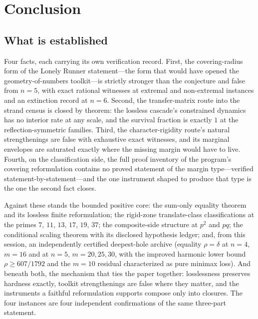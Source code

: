 
\section{Conclusion}\label{sec:concl}

\subsection{What is established}

Four facts, each carrying its own verification record. First, the
covering-radius form of the Lonely Runner statement---the form that
would have opened the geometry-of-numbers toolkit---is strictly stronger
than the conjecture and false from $n=5$, with exact rational witnesses
at extremal and non-extremal instances and an extinction record at
$n=6$. Second, the transfer-matrix route into the strand census is
closed by theorem: the lossless cascade's constrained dynamics has no
interior rate at any scale, and the survival fraction is exactly $1$ at
the reflection-symmetric families. Third, the character-rigidity route's
natural strengthenings are false with exhaustive exact witnesses, and
its marginal envelopes are saturated exactly where the missing margin
would have to live. Fourth, on the classification side, the full proof
inventory of the program's covering reformulation contains no proved
statement of the margin type---verified statement-by-statement---and the
one instrument shaped to produce that type is the one the second fact
closes.

Against these stands the bounded positive core: the sum-only equality
theorem and its lossless finite reformulation; the rigid-zone
translate-class classifications at the primes $7$, $11$, $13$, $17$,
$19$, $37$; the composite-side structure at $p^2$ and $pq$; the
conditional scaling theorem with its disclosed hypothesis ledger; and,
from this session, an independently certified deepest-hole archive
(equality $\rho=\delta$ at $n=4$, $m=16$ and at $n=5$,
$m=20,25,30$, with the improved harmonic lower bound
$\rho\ge607/1792$ and the $m=10$ residual characterized as pure
minimax loss). And
beneath both, the mechanism that ties the paper together: losslessness
preserves hardness exactly, toolkit strengthenings are false where they
matter, and the instruments a faithful reformulation supports compose
only into closures. The four instances are four independent
confirmations of the same three-part statement.

